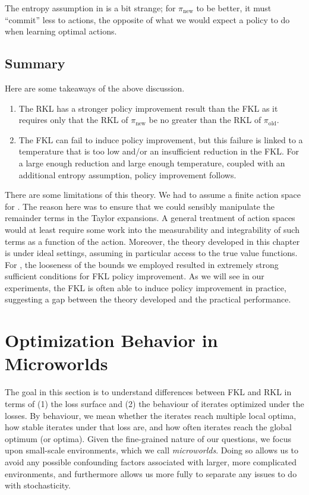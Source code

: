 \documentclass[twoside,11pt]{article}
\newcommand{\pinew}{{\pi_\mathrm{new}}}
\newcommand{\piold}{{\pi_\mathrm{old}}}
\begin{document}
\noindent The entropy assumption in  is a bit strange; for $\pinew$ to be better, it must ``commit'' less to actions, the opposite of what we would expect a policy to do when learning optimal actions. 

\subsection{Summary}
Here are some takeaways of the above discussion. 
\begin{enumerate}
    \item The RKL has a stronger policy improvement result than the FKL as it requires only that the RKL of $\pinew$ be no greater than the RKL of $\piold$.
    \item The FKL can fail to induce policy improvement, but this failure is linked to a temperature that is too low and/or an insufficient reduction in the FKL. For a large enough reduction and large enough temperature, coupled with an additional entropy assumption, policy improvement follows. 
\end{enumerate}


There are some limitations of this theory. We had to assume a finite action space for . The reason here was to ensure that we could sensibly manipulate the remainder terms in the Taylor expansions. A general treatment of action spaces would at least require some work into the measurability and integrability of such terms as a function of the action. Moreover, the theory developed in this chapter is under ideal settings, assuming in particular access to the true value functions. For , the looseness of the bounds we employed resulted in extremely strong sufficient conditions for FKL policy improvement. As we will see in our experiments, the FKL is often able to induce policy improvement in practice, suggesting a gap between the theory developed and the practical performance. 

\section{Optimization Behavior in Microworlds} 
The goal in this section is to understand differences between FKL and RKL in terms of (1) the loss surface and (2) the behaviour of iterates optimized under the losses. By behaviour, we mean whether the iterates reach multiple local optima, how stable iterates under that loss are, and how often iterates reach the global optimum (or optima). Given the fine-grained nature of our questions, we focus upon small-scale environments, which we call \textit{microworlds}. Doing so allows us to avoid any possible confounding factors associated with larger, more complicated environments, and furthermore allows us more fully to separate any issues to do with stochasticity. 
\end{document}

